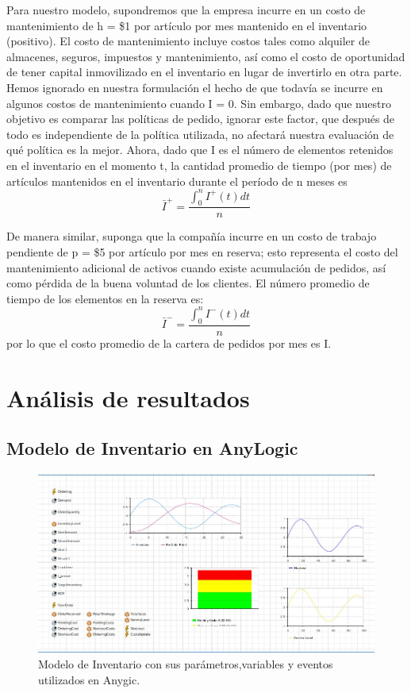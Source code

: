 Para nuestro modelo, supondremos que la empresa incurre en un costo de mantenimiento de
h = \$1 por artículo por mes mantenido en el inventario (positivo).
El costo de mantenimiento incluye costos tales como alquiler de almacenes, seguros, impuestos
y mantenimiento, así como el costo de oportunidad de tener capital inmovilizado en el inventario
en lugar de invertirlo en otra parte.
Hemos ignorado en nuestra formulación el hecho de que todavía se incurre en algunos costos de
mantenimiento cuando I = 0.
Sin embargo, dado que nuestro objetivo es comparar las políticas de pedido, ignorar este factor,
que después de todo es independiente de la política utilizada, no afectará nuestra evaluación
de qué política es la mejor.
Ahora, dado que I es el número de elementos retenidos en el inventario en el momento t,
la cantidad promedio de tiempo (por mes) de artículos mantenidos en el inventario durante el
período de n meses es
\begin{equation}
  \label{eq:equation11}
  \bar{I}^{+}=\frac{\int_{0}^{n}I^{+}(t)dt}{n}
\end{equation}

De manera similar, suponga que la compañía incurre en un costo de trabajo pendiente de p = \$5 por
artículo por mes en reserva;
esto representa el costo del mantenimiento adicional de activos cuando existe acumulación de pedidos,
así como pérdida de la buena voluntad de los clientes.
El número promedio de tiempo de los elementos en la reserva es:
\begin{equation}
    \label{eq:equation12}
    \bar{I}^{-}=\frac{\int_{0}^{n}I^{-}(t)dt}{n}
\end{equation}
por lo que el costo promedio de la cartera de pedidos por mes es \pi I.

\section{Análisis de resultados}

    

\subsection{Modelo de Inventario en AnyLogic}
\label{subsec:modelo-de-inventario-en-anylogic}
    \begin{figure}[H]
        \includegraphics[width=\linewidth]{images/anylogic-inventario}
        \caption{Modelo de Inventario con sus parámetros,variables y eventos utilizados en Anygic.}
    \end{figure}


